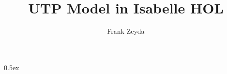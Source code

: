 \documentclass[11pt,a4paper]{article}
\begin{document}
\title{UTP Model in Isabelle HOL}

\author{Frank Zeyda}

\maketitle

\tableofcontents

\parindent 0pt\parskip 0.5ex

%

\newpage



\newpage



\newpage



\newpage



\newpage



\newpage



\newpage



\newpage



\newpage



\newpage



\newpage



\newpage



\newpage



\newpage



\newpage



\newpage



%
%
\end{document}
